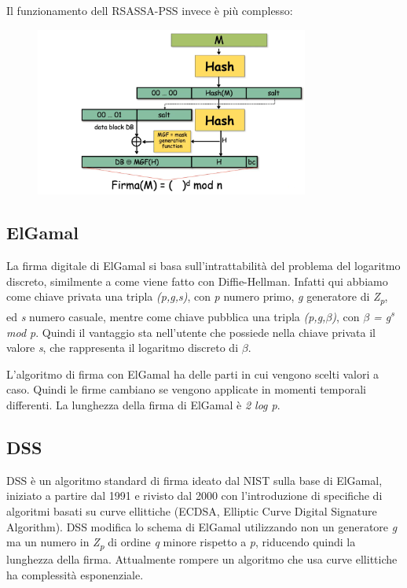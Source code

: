 Il funzionamento dell RSASSA-PSS invece è più complesso:

\begin{figure}[htb!]
    \centering
    \includegraphics[width=9cm]{./Images/cap1/1.53.png}
\end{figure} 

\subsection{ElGamal}
La firma digitale di ElGamal si basa sull'intrattabilità del problema del logaritmo discreto, similmente a come viene fatto con Diffie-Hellman. Infatti qui abbiamo come chiave privata una tripla \textit{(p,g,s)}, con \textit{p} numero primo, \textit{g} generatore di \textit{Z\textsubscript{p}}, ed \textit{s} numero casuale, mentre come chiave pubblica una tripla \textit{(p,g,$\beta$)}, con $\beta$ \textit{= g\textsuperscript{s} mod p}. Quindi il vantaggio sta nell'utente che possiede nella chiave privata il valore \textit{s}, che rappresenta il logaritmo discreto di $\beta$.

L'algoritmo di firma con ElGamal ha delle parti in cui vengono scelti valori a caso. Quindi le firme cambiano se vengono applicate in momenti temporali differenti. La lunghezza della firma di ElGamal è \textit{2 log p}. 

\subsection{DSS}
DSS è un algoritmo standard di firma ideato dal NIST sulla base di ElGamal, iniziato a partire dal 1991 e rivisto dal 2000 con l'introduzione di specifiche di algoritmi basati su curve ellittiche (ECDSA, Elliptic Curve Digital Signature Algorithm).
DSS modifica lo schema di ElGamal utilizzando non un generatore \textit{g} ma un numero in \textit{Z\textsubscript{p}} di ordine \textit{q} minore rispetto a \textit{p}, riducendo quindi la lunghezza della firma. 
Attualmente rompere un algoritmo che usa curve ellittiche ha complessità esponenziale. 

